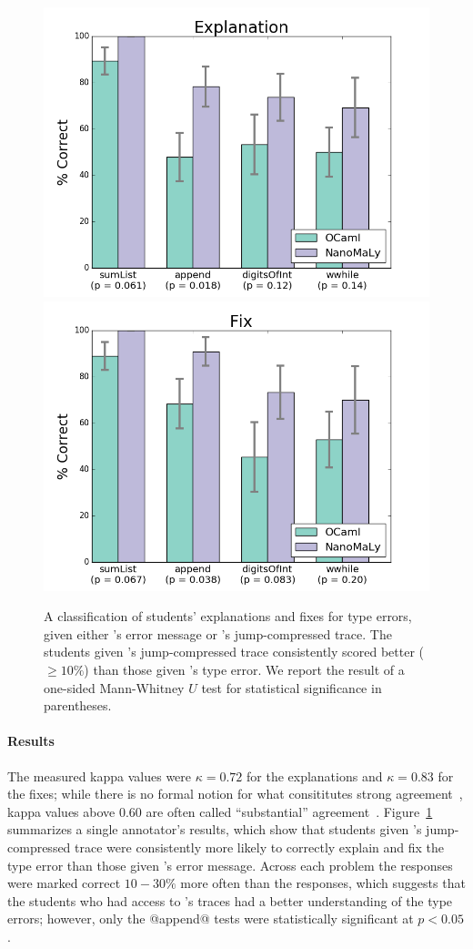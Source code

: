 \begin{figure}[t]
\includegraphics[width=0.7\linewidth]{nanomaly/user-study-reason.png}
\includegraphics[width=0.7\linewidth]{nanomaly/user-study-fix.png}
\caption{A classification of students' explanations and fixes for type
  errors, given either \ocaml's error message or \toolname's
  jump-compressed trace. The students given \toolname's jump-compressed
  trace consistently scored better ($\ge 10\%$) than those given
  \ocaml's type error. We report the result of a one-sided Mann-Whitney
  $U$ test for statistical significance in parentheses.}
\label{fig:results-user-study}
\end{figure}

\paragraph{Results}
%
The measured kappa values were $\kappa = 0.72$ for the explanations and
$\kappa = 0.83$ for the fixes; while there is no formal notion for what
consititutes strong agreement~\cite{Krippendorff2012-wd}, kappa values
above $0.60$ are often called ``substantial''
agreement~\cite{Landis1977-ey}.
%
Figure~\ref{fig:results-user-study} summarizes a single annotator's
results, which show that students given \toolname's jump-compressed
trace were consistently more likely to correctly explain
and fix the type error than those given \ocaml's error message.
%
Across each problem the \toolname responses were marked correct
$10-30\%$ more often than the \ocaml responses, which suggests that
the students who had access to \toolname's traces had a better
understanding of the type errors;
%
however, only the @append@ tests were statistically significant at
$p < 0.05$.
%

